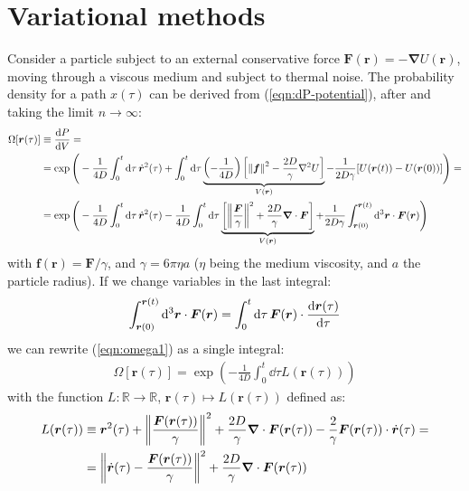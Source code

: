 \documentclass[../template.tex]{subfiles}
\begin{document}
\section{Variational methods}
Consider a particle subject to an external conservative force $\bm{F}(\bm{r}) = -\bm{\nabla} U(\bm{r})$, moving through a viscous medium and subject to thermal noise. The probability density for a path $x(\tau)$ can be derived from (\ref{eqn:dP-potential}), after  and taking the limit $n \to \infty$:
\begin{align}\nonumber
    \Omega[\bm{r}(\tau)] &\equiv \frac{\dd{P}}{\dd{V}} =\\ \nonumber
    &= \exp \Bigg(-\frac{1}{4D}\int_0^t \dd{\tau} \dot{\bm{r}}^2(\tau)  + \int_0^t \dd{\tau} \underbrace{\left(-\frac{1}{4D} \right)\left[\norm{\bm{f}}^2 - \frac{2D}{\gamma} \nabla^2 U \right]}_{V(\bm{r})} -\frac{1}{2 D \gamma} [U(\bm{r}(t)) - U(\bm{r}(0))] \Bigg) =\\
    &=\exp \Bigg(-\frac{1}{4D}\int_0^t \dd{\tau} \dot{\bm{r}}^2(\tau)  -\frac{1}{4D} \int_0^t \dd{\tau} \underbrace{\left[\norm{\frac{\bm{F}}{\gamma} }^2 + \frac{2D}{\gamma} \bm{\nabla}\cdot \bm{F} \right]}_{V(\bm{r})} +\frac{1}{2 D \gamma} \int_{\bm{r}(0)}^{\bm{r}(t)} \dd[3]{\bm{r}} \cdot \bm{F}(\bm{r}) \Bigg)
    \label{eqn:omega1}
\end{align}
with $\bm{f}(\bm{r}) = \bm{F}/\gamma$, and $\gamma = 6 \pi \eta a$ ($\eta$ being the medium viscosity, and $a$ the particle radius). If we change variables in the last integral:
\begin{align*}
    \int_{\bm{r}(0)}^{\bm{r}(t)} \dd[3]{\bm{r}} \cdot \bm{F}(\bm{r}) = \int_{0}^t \dd{\tau} \bm{F}(\bm{r}) \cdot \dv{\bm{r}(\tau)}{\tau}
\end{align*}
we can rewrite (\ref{eqn:omega1}) as a single integral:
\begin{align}\label{eqn:omega2}
    \Omega[\bm{r}(\tau)] = \exp\left(-\frac{1}{4D} \int_0^t \dd{\tau} L(\bm{r}(\tau)) \right)
\end{align}
with the function $L\colon \mathbb{R} \to \mathbb{R}$, $\bm{r}(\tau) \mapsto L(\bm{r}(\tau))$ defined as:
\begin{align}\nonumber
    L(\bm{r}(\tau)) &\equiv \bm{r}^2(\tau) + \norm{\frac{\bm{F}(\bm{r}(\tau))}{\gamma}}^2 + \frac{2D}{\gamma} \bm{\nabla}\cdot \bm{F}(\bm{r}(\tau)) - \frac{2}{\gamma} \bm{F}(\bm{r}(\tau)) \cdot \dot{\bm{r}}(\tau) =\\
    &= \norm{\dot{\bm{r}}(\tau) - \frac{\bm{F}(\bm{r}(\tau))}{\gamma} }^2 + \frac{2D}{\gamma} \bm{\nabla}\cdot \bm{F}(\bm{r}(\tau)) \label{eqn:Lagrangian}
\end{align}
\end{document}
